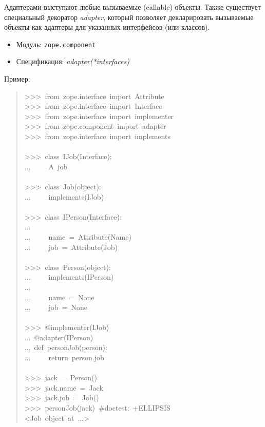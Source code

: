 \documentclass[14pt,a4paper,openany,twoside,final]{extbook}
\providecommand*{\DUroletitlereference}[1]{\textsl{#1}}
\begin{document}
Адаптерами выступают любые вызываемые (callable) объекты.  Также
существует специальный декоратор \DUroletitlereference{adapter}, который позволяет
декларировать вызываемые объекты как адаптеры для указанных
интерфейсов (или классов).

\begin{itemize}

\item Модуль: \texttt{zope.component}

\item Спецификация: \DUroletitlereference{adapter(*interfaces)}

\end{itemize}

Пример:

\begin{quote}{\ttfamily \raggedright \noindent
>{}>{}>~from~zope.interface~import~Attribute\\
>{}>{}>~from~zope.interface~import~Interface\\
>{}>{}>~from~zope.interface~import~implementer\\
>{}>{}>~from~zope.component~import~adapter\\
>{}>{}>~from~zope.interface~import~implements\\
~\\
>{}>{}>~class~IJob(Interface):\\
...~~~~~\textquotedbl{}\textquotedbl{}\textquotedbl{}A~job\textquotedbl{}\textquotedbl{}\textquotedbl{}\\
~\\
>{}>{}>~class~Job(object):\\
...~~~~~implements(IJob)\\
~\\
>{}>{}>~class~IPerson(Interface):\\
...\\
...~~~~~name~=~Attribute(\textquotedbl{}Name\textquotedbl{})\\
...~~~~~job~=~Attribute(\textquotedbl{}Job\textquotedbl{})\\
~\\
>{}>{}>~class~Person(object):\\
...~~~~~implements(IPerson)\\
...\\
...~~~~~name~=~None\\
...~~~~~job~=~None\\
~\\
>{}>{}>~@implementer(IJob)\\
...~@adapter(IPerson)\\
...~def~personJob(person):\\
...~~~~~return~person.job\\
~\\
>{}>{}>~jack~=~Person()\\
>{}>{}>~jack.name~=~\textquotedbl{}Jack\textquotedbl{}\\
>{}>{}>~jack.job~=~Job()\\
>{}>{}>~personJob(jack)~\#doctest:~+ELLIPSIS\\
<Job~object~at~...>
}
\end{quote}
\end{document}
